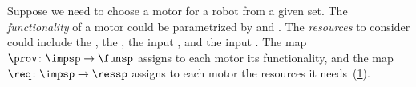 \begin{example}
  \begin{comment}

  \begin{table}[tbh]
    \begin{center}
      \begin{tabular}{cccc}
        Technology & Specific energy [\unitfrac[]{J}{kg}] & Specific cost [\unitfrac[]{J}{\stdcurr}]
        & Life [\# cycles]
        \\
        \hline
        $\mathsf{NiMH}$  & 100.0 & 3.41 & 500    \\
        $\mathsf{NiH2}$  & 45.0  & 10.5 & 20,000 \\
        $\mathsf{LCO}$   & 195.0 & 2.84 & 750    \\
        $\mathsf{LMO}$   & 150.0 & 2.84 & 500    \\
        $\mathsf{NiCad}$ & 30.0  & 7.50 & 500    \\
        $\mathsf{SLA}$   & 30.0  & 7.00 & 500    \\
        $\mathsf{LiPo}$  & 250.0 & 2.50 & 600    \\
        $\mathsf{LFP}$   & 90.0  & 1.50 & 1,500
      \end{tabular}
    \end{center}
    \caption{Specifications of common battery technologies~\cite{censi2015}. }
    \label{tab:battery}
  \end{table}
\end{comment}

\end{example}


\begin{example}
  \label{exa:motor}
  Suppose we need to choose a motor for a robot from
  a given set. The \emph{functionality} of a motor could be parametrized
  by  and . The \emph{resources} to consider
  could include the \R{\unit[cost]{[USD]}}, the \R{\unit[mass]{[g]}}, the
  input \R{\unit[voltage]{[V]}}, and the input \R{\unit[current]{[A]}}.
  The map~$\prov \colon \impsp\to\funsp$ assigns to each motor its
  functionality, and the map~$\req \colon \impsp\rightarrow\ressp$ assigns
  to each motor the resources it needs~(\cref{fig:motor_evalexec}).
\end{example}

\begin{figure}[h]
  \centering
  \caption{}
  \label{fig:motor_evalexec}
\end{figure}

